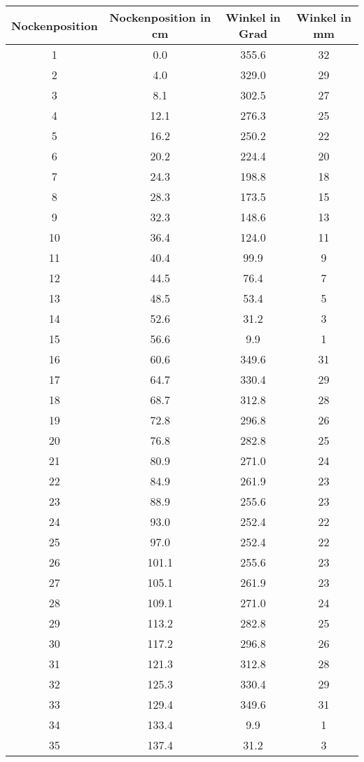 \documentclass[10pt, a4paper]{article}
\begin{document}
\begin{center}
	\begin{tabular}{c|c|c|c}
		Nockenposition & Nockenposition in cm & Winkel in Grad & Winkel in mm \\
		\hline
		1 & 0.0 & 355.6 & 32 \\
		2 & 4.0 & 329.0 & 29 \\
		3 & 8.1 & 302.5 & 27 \\
		4 & 12.1 & 276.3 & 25 \\
		5 & 16.2 & 250.2 & 22 \\
		6 & 20.2 & 224.4 & 20 \\
		7 & 24.3 & 198.8 & 18 \\
		8 & 28.3 & 173.5 & 15 \\
		9 & 32.3 & 148.6 & 13 \\
		10 & 36.4 & 124.0 & 11 \\
		11 & 40.4 & 99.9 & 9 \\
		12 & 44.5 & 76.4 & 7 \\
		13 & 48.5 & 53.4 & 5 \\
		14 & 52.6 & 31.2 & 3 \\
		15 & 56.6 & 9.9 & 1 \\
		16 & 60.6 & 349.6 & 31 \\
		17 & 64.7 & 330.4 & 29 \\
		18 & 68.7 & 312.8 & 28 \\
		19 & 72.8 & 296.8 & 26 \\
		20 & 76.8 & 282.8 & 25 \\
		21 & 80.9 & 271.0 & 24 \\
		22 & 84.9 & 261.9 & 23 \\
		23 & 88.9 & 255.6 & 23 \\
		24 & 93.0 & 252.4 & 22 \\
		25 & 97.0 & 252.4 & 22 \\
		26 & 101.1 & 255.6 & 23 \\
		27 & 105.1 & 261.9 & 23 \\
		28 & 109.1 & 271.0 & 24 \\
		29 & 113.2 & 282.8 & 25 \\
		30 & 117.2 & 296.8 & 26 \\
		31 & 121.3 & 312.8 & 28 \\
		32 & 125.3 & 330.4 & 29 \\
		33 & 129.4 & 349.6 & 31 \\
		34 & 133.4 & 9.9 & 1 \\
		35 & 137.4 & 31.2 & 3 \\

\end{tabular}
\end{center}
\end{document}
